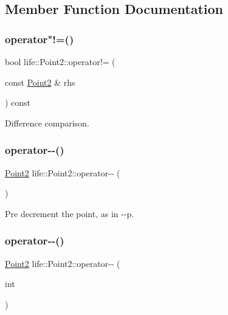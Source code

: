\subsection{Member Function Documentation}
\mbox{\label{structlife_1_1_point2_a39b4687ad40acf7e01e906f8d0474edb}} 
\subsubsection{\texorpdfstring{operator"!=()}{operator!=()}}
{\footnotesize\ttfamily bool life\+::\+Point2\+::operator!= (\begin{DoxyParamCaption}\item[{const \mbox{\hyperlink{structlife_1_1_point2}{Point2}} \&}]{rhs }\end{DoxyParamCaption}) const\hspace{0.3cm}{\ttfamily [inline]}}



Difference comparison. 

\mbox{\label{structlife_1_1_point2_a9536e66da2ec9dc3784596291069b852}} 
\subsubsection{\texorpdfstring{operator-\/-\/()}{operator--()}\hspace{0.1cm}{\footnotesize\ttfamily [1/2]}}
{\footnotesize\ttfamily \mbox{\hyperlink{structlife_1_1_point2}{Point2}} life\+::\+Point2\+::operator-\/-\/ (\begin{DoxyParamCaption}{ }\end{DoxyParamCaption})\hspace{0.3cm}{\ttfamily [inline]}}



Pre decrement the point, as in {\ttfamily -\/-\/p}. 

\mbox{\label{structlife_1_1_point2_ac7a2f2f21dd979316824a8a34b5c08d7}} 
\subsubsection{\texorpdfstring{operator-\/-\/()}{operator--()}\hspace{0.1cm}{\footnotesize\ttfamily [2/2]}}
{\footnotesize\ttfamily \mbox{\hyperlink{structlife_1_1_point2}{Point2}} life\+::\+Point2\+::operator-\/-\/ (\begin{DoxyParamCaption}\item[{int}]{ }\end{DoxyParamCaption})\hspace{0.3cm}{\ttfamily [inline]}}



